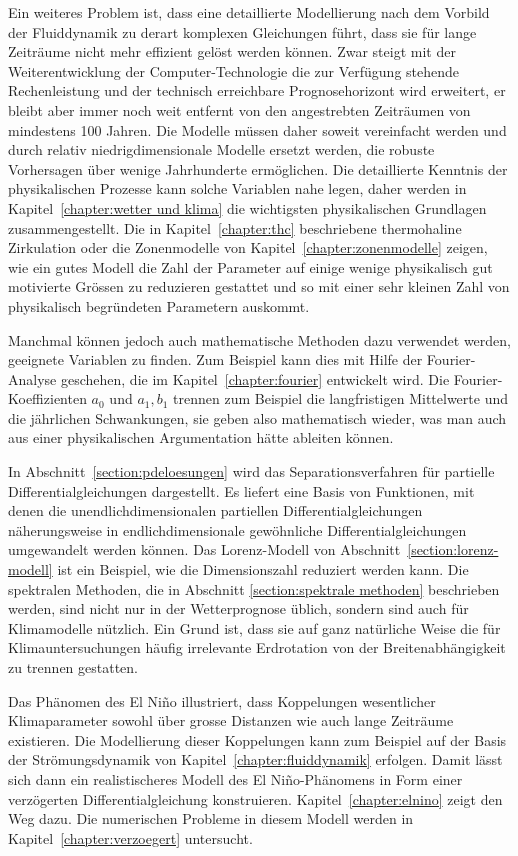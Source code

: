 Ein weiteres Problem ist, dass eine detaillierte Modellierung nach dem
Vorbild der Fluiddynamik zu derart komplexen Gleichungen führt, dass 
sie für lange Zeiträume nicht mehr effizient gelöst werden können.
Zwar steigt mit der Weiterentwicklung der Computer-Technologie die 
zur Verfügung stehende Rechenleistung und der technisch erreichbare
Prognosehorizont wird erweitert, er bleibt aber immer noch weit entfernt von den
angestrebten Zeiträumen von mindestens 100 Jahren.
Die Modelle müssen daher soweit vereinfacht werden und durch relativ
niedrigdimensionale Modelle ersetzt werden, die robuste Vorhersagen
über wenige Jahrhunderte ermöglichen.
Die detaillierte Kenntnis der physikalischen Prozesse kann solche 
Variablen nahe legen, daher werden in Kapitel~\ref{chapter:wetter und klima}
die wichtigsten physikalischen Grundlagen zusammengestellt.
Die in Kapitel~\ref{chapter:thc} beschriebene thermohaline Zirkulation
oder die Zonenmodelle von Kapitel~\ref{chapter:zonenmodelle}
zeigen, wie ein gutes Modell die Zahl der Parameter auf einige wenige
physikalisch gut motivierte Grössen zu reduzieren gestattet und 
so mit einer sehr kleinen Zahl von physikalisch begründeten
Parametern auskommt.

Manchmal können jedoch auch mathematische Methoden dazu verwendet werden,
geeignete Variablen zu finden.
Zum Beispiel kann dies mit Hilfe der Fourier-Analyse geschehen, die
im Kapitel~\ref{chapter:fourier} entwickelt wird.
Die Fourier-Koeffizienten $a_0$ und $a_1,b_1$ trennen zum Beispiel die
langfristigen Mittelwerte und die jährlichen Schwankungen, sie geben
also mathematisch wieder, was man auch aus einer physikalischen
Argumentation hätte ableiten können.

In Abschnitt~\ref{section:pdeloesungen} wird das Separationsverfahren 
für partielle Differentialgleichungen dargestellt.
Es liefert eine Basis von Funktionen, mit denen die unendlichdimensionalen
partiellen Differentialgleichungen näherungsweise in endlichdimensionale
gewöhnliche Differentialgleichungen umgewandelt werden können.
Das Lorenz-Modell von Abschnitt~\ref{section:lorenz-modell} ist ein
Beispiel, wie die Dimensionszahl reduziert werden kann.
Die spektralen Methoden, die in Abschnitt \ref{section:spektrale methoden}
beschrieben werden, sind nicht nur in der Wetterprognose üblich, sondern
sind auch für Klimamodelle nützlich.
Ein Grund ist, dass sie auf ganz natürliche Weise die für
Klimauntersuchungen häufig irrelevante Erdrotation von der
Breitenabhängigkeit zu trennen gestatten.

Das Phänomen des El Niño illustriert, dass Koppelungen wesentlicher
Klimaparameter sowohl über grosse Distanzen wie auch lange Zeiträume
existieren.
Die Modellierung dieser Koppelungen kann zum Beispiel auf der Basis
der Strömungsdynamik von Kapitel~\ref{chapter:fluiddynamik} erfolgen.
Damit lässt sich dann ein realistischeres Modell des El Niño-Phänomens
in Form einer verzögerten Differentialgleichung konstruieren.
Kapitel~\ref{chapter:elnino} zeigt den Weg dazu.
Die numerischen Probleme in diesem Modell werden in
Kapitel~\ref{chapter:verzoegert} untersucht.

